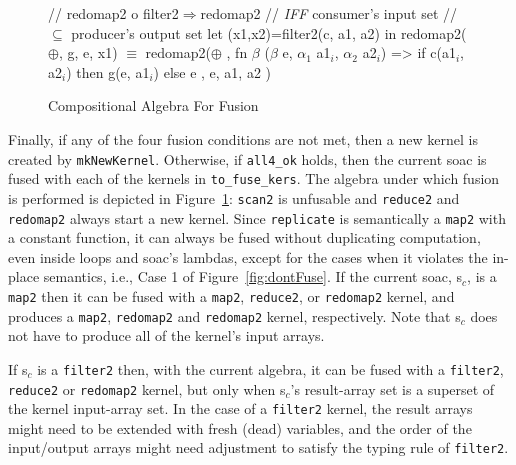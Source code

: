 \documentclass{sigplanconf}  %
\newcommand{\emp}[1]{\textcolor{DikuRed}{ #1}}
\newcommand{\emphh}[1]{\textcolor{CosGreen}{ #1}}
\newcommand{\mymath}[1]{$ #1 $}
\newcommand{\myindx}[1]{_{#1}}
\begin{document}
\begin{figure}[bt]
{\begin{minipage}{0.48\columnwidth}
\begin{colorcode}
//\emp{redomap2 o filter2\mymath{\Rightarrow}redomap2}
//\emp{{\em{}IFF} consumer's input set}
//\emp{  \mymath{\subseteq} producer's output set}
let (x1,x2)=filter2(c, a1, a2)
in  redomap2(\mymath{\oplus}, g, e, x1)
    \emphh{\mymath{\equiv}}
redomap2(\mymath{\oplus}
, fn \mymath{\beta} (\mymath{\beta} e, \mymath{\alpha\myindx{1}} a1\mymath{\myindx{i}}, \mymath{\alpha\myindx{2}} a2\mymath{\myindx{i}})
   => if c(a1\mymath{\myindx{i}}, a2\mymath{\myindx{i}})
      then g(e, a1\mymath{\myindx{i}}) else e
, e, a1, a2 )
\end{colorcode}
\end{minipage}
} 
\caption{Compositional Algebra For Fusion}
\label{fig:CompatFuse}
\end{figure}



Finally, if any of the four fusion conditions are not met, 
then a new kernel is created by {\tt mkNewKernel}.
Otherwise, if {\tt all4\_ok} holds, then the current {\sc soac}
is fused with each of the kernels in {\tt to\_fuse\_kers}.
%
The algebra under which fusion is performed is depicted in Figure~\ref{fig:CompatFuse}:
{\tt scan2} is unfusable and {\tt reduce2} and {\tt redomap2} always 
start a new kernel.  Since {\tt replicate} is semantically a {\tt map2} 
with a constant function, it can always be fused without duplicating
computation, even inside loops and {\sc soac}'s lambdas, except for the 
cases when it violates the in-place semantics, i.e., \emp{Case 1} of 
Figure~\ref{fig:dontFuse}.
%
If the current {\sc soac}, {\sc s}$_c$, is a {\tt map2} then it can be fused 
with a {\tt map2}, {\tt reduce2}, or {\tt redomap2} kernel, and produces 
a {\tt map2}, {\tt redomap2} and {\tt redomap2} kernel, respectively.
Note that {\sc s}$_c$ does not have to produce all of the kernel's input arrays.

If {\sc s}$_c$ is a {\tt filter2} then, with the current algebra, it can be fused
with a {\tt filter2}, {\tt reduce2} or {\tt redomap2} kernel, but only when
{\sc s}$_c$'s result-array set is a superset of the kernel input-array set. 
In the case of a {\tt filter2} kernel, the result arrays might need to 
be extended with fresh (dead) variables, and the order of the input/output
arrays might need adjustment to satisfy the typing rule of {\tt filter2}.
\end{document}
